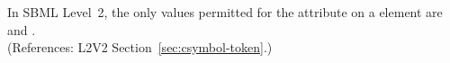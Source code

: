 In SBML Level~2, the only values permitted for the
 attribute on a  element are
 and
.\\
(References: L2V2 Section~\ref{sec:csymbol-token}.)
